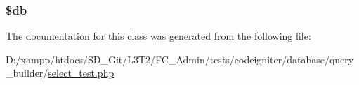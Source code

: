 \subsubsection[{\$db}]{\setlength{\rightskip}{0pt plus 5cm}\$db\hspace{0.3cm}{\ttfamily [protected]}}\label{class_select__test_a1fa3127fc82f96b1436d871ef02be319}


The documentation for this class was generated from the following file\+:\begin{DoxyCompactItemize}
\item 
D\+:/xampp/htdocs/\+S\+D\+\_\+\+Git/\+L3\+T2/\+F\+C\+\_\+\+Admin/tests/codeigniter/database/query\+\_\+builder/\hyperlink{select__test_8php}{select\+\_\+test.\+php}\end{DoxyCompactItemize}
